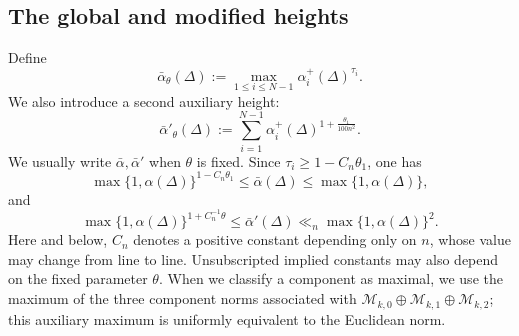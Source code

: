 \documentclass[reqno,11pt]{amsart}
\numberwithin{equation}{section}
\theoremstyle{definition}
\theoremstyle{remark}
\begin{document}
\subsection{The global and modified heights}
Define
\begin{equation}\label{eq:bar-alpha-definition}
\bar\alpha_\theta(\Delta)
:=
\max_{1\le i\le N-1}\alpha_i^+(\Delta)^{\tau_i}.
\end{equation}
We also introduce a second auxiliary height:
\begin{equation}\label{eq:bar-alpha-prime-definition}
\bar\alpha'_\theta(\Delta)
:=
\sum_{i=1}^{N-1}\alpha_i^+(\Delta)^{1+\frac{\theta_1}{100n^2}}.
\end{equation}
We usually write
$\bar\alpha,\bar\alpha'$ when $\theta$ is fixed. Since
$\tau_i\ge1-C_n\theta_1$, one has
\begin{equation}\label{eq:bar-alpha-comparison}
\max\{1,\alpha(\Delta)\}^{1-C_n\theta_1}
\le \bar\alpha(\Delta)
\le \max\{1,\alpha(\Delta)\},
\end{equation}
and
\begin{equation}\label{eq:bar-alpha'-comparison}
\max\{1,\alpha(\Delta)\}^{1+C_n^{-1}\theta}
\le \bar\alpha'(\Delta)
\ll_n \max\{1,\alpha(\Delta)\}^{2}.
\end{equation}
Here and below, $C_n$ denotes a positive constant depending only on $n$,
whose value may change from line to line. Unsubscripted implied constants may
also depend on the fixed parameter $\theta$.
 When we classify a component as maximal, we use the
maximum of the three component norms associated with
$\mathcal M_{k,0}\oplus\mathcal M_{k,1}\oplus\mathcal M_{k,2}$;
this auxiliary maximum is uniformly equivalent to the Euclidean norm.
\end{document}
